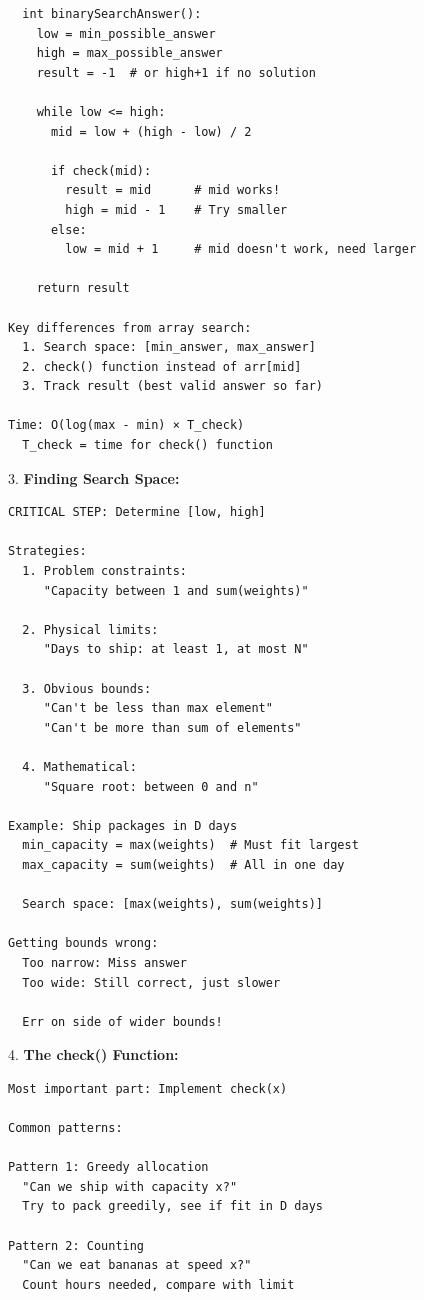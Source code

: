 \documentclass[11pt,a4paper,oneside]{book}
\begin{document}
\begin{tcolorbox}[
    enhanced,breakable,
    colback=white,
    colframe=deepblue,
    boxrule=1.5pt,
    arc=3mm,
    title=\textbf{The Search Space Transformation}
]
\begin{verbatim}
  int binarySearchAnswer():
    low = min_possible_answer
    high = max_possible_answer
    result = -1  # or high+1 if no solution
    
    while low <= high:
      mid = low + (high - low) / 2
      
      if check(mid):
        result = mid      # mid works!
        high = mid - 1    # Try smaller
      else:
        low = mid + 1     # mid doesn't work, need larger
    
    return result

Key differences from array search:
  1. Search space: [min_answer, max_answer]
  2. check() function instead of arr[mid]
  3. Track result (best valid answer so far)

Time: O(log(max - min) × T_check)
  T_check = time for check() function
\end{verbatim}

3. \textbf{Finding Search Space:}
\begin{verbatim}
CRITICAL STEP: Determine [low, high]

Strategies:
  1. Problem constraints:
     "Capacity between 1 and sum(weights)"
  
  2. Physical limits:
     "Days to ship: at least 1, at most N"
  
  3. Obvious bounds:
     "Can't be less than max element"
     "Can't be more than sum of elements"
  
  4. Mathematical:
     "Square root: between 0 and n"

Example: Ship packages in D days
  min_capacity = max(weights)  # Must fit largest
  max_capacity = sum(weights)  # All in one day
  
  Search space: [max(weights), sum(weights)]

Getting bounds wrong:
  Too narrow: Miss answer
  Too wide: Still correct, just slower
  
  Err on side of wider bounds!
\end{verbatim}

4. \textbf{The check() Function:}
\begin{verbatim}
Most important part: Implement check(x)

Common patterns:

Pattern 1: Greedy allocation
  "Can we ship with capacity x?"
  Try to pack greedily, see if fit in D days

Pattern 2: Counting
  "Can we eat bananas at speed x?"
  Count hours needed, compare with limit


\end{verbatim}
\end{tcolorbox}
\end{document}

